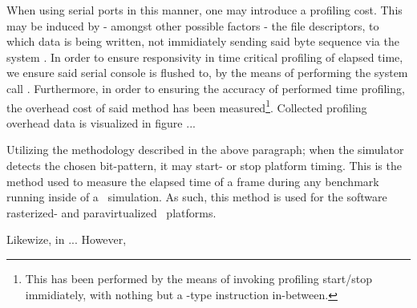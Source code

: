 
When using serial ports in this manner, one may introduce a profiling cost.
This may be induced by - amongst other possible factors - the file descriptors, to which data is being written, not immidiately sending said byte sequence via the system \dvttermuart .
In order to ensure responsivity in time critical profiling of elapsed time, we ensure said serial console is flushed to, by the means of performing the system call .
Furthermore, in order to ensuring the accuracy of performed time profiling, the overhead cost of said method has been measured\footnote{This has been performed by the means of invoking profiling start/stop immidiately, with nothing but a -type instruction in-between.}.
Collected profiling overhead data is visualized in figure  ...


Utilizing the methodology described in the above paragraph; when the simulator detects the chosen bit-pattern, it may start- or stop platform timing.
This is the method used to measure the elapsed time of a frame during any benchmark running inside of a \dvttermsimics\ simulation.
As such, this method is used for the software rasterized- and paravirtualized \dvttermsimics\ platforms. 

Likewize, in \dvttermqemu ...
However,



